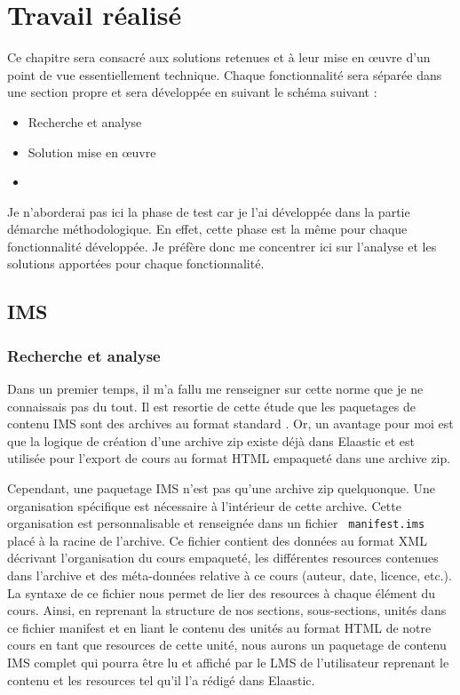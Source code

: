 \chapter{Travail réalisé}
Ce chapitre sera consacré aux solutions retenues et à leur mise en \oe uvre d'un
point de vue essentiellement technique. Chaque fonctionnalité sera séparée dans
une section propre et sera développée en suivant le schéma suivant :
\begin{itemize}
  \item Recherche et analyse
  \item Solution mise en \oe uvre
  \item 
\end{itemize}

Je n'aborderai pas ici la phase de test car je l'ai développée dans la partie
démarche méthodologique. En effet, cette phase est la même pour chaque
fonctionnalité développée. Je préfère donc me concentrer ici sur l'analyse et
les solutions apportées pour chaque fonctionnalité. %
\section{IMS}
\subsection{Recherche et analyse}
Dans un premier temps, il m'a fallu me renseigner sur cette norme que je ne
connaissais pas du tout. Il est resortie de cette étude que les paquetages de
contenu IMS sont des archives au format standard . Or, un avantage
pour moi est que la logique de création d'une archive zip existe déjà dans
Elaastic et est utilisée pour l'export de cours au format HTML empaqueté dans
une archive zip.

Cependant, une paquetage IMS n'est pas qu'une archive zip quelquonque. Une
organisation spécifique est nécessaire à l'intérieur de cette archive. Cette
organisation est personnalisable et renseignée dans un fichier {\tt
manifest.ims} placé à la racine de l'archive. Ce fichier contient des données au
format XML décrivant l'organisation du cours empaqueté, les différentes
resources contenues dans l'archive et des méta-données relative à ce cours
(auteur, date, licence, etc.). La syntaxe de ce fichier nous permet de lier des
resources à chaque élément du cours.
Ainsi, en reprenant la structure de nos sections, sous-sections, unités dans ce
fichier manifest et en liant le contenu des unités au format HTML de notre cours
en tant que resources de cette unité, nous aurons un paquetage de contenu IMS
complet qui pourra être lu et affiché par le LMS de l'utilisateur reprenant le
contenu et les resources tel qu'il l'a rédigé dans Elaastic.

